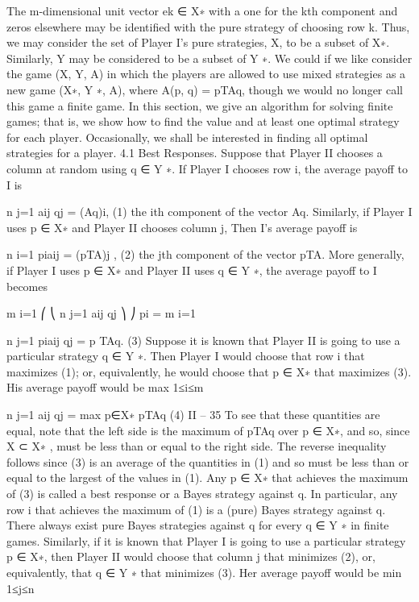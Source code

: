 The m-dimensional unit vector ek ∈ X∗ with a one for the kth component and zeros
elsewhere may be identified with the pure strategy of choosing row k. Thus, we may
consider the set of Player I’s pure strategies, X, to be a subset of X∗. Similarly, Y may
be considered to be a subset of Y ∗. We could if we like consider the game (X, Y, A) in
which the players are allowed to use mixed strategies as a new game (X∗, Y ∗, A), where
A(p, q) = pTAq, though we would no longer call this game a finite game.
In this section, we give an algorithm for solving finite games; that is, we show how to
find the value and at least one optimal strategy for each player. Occasionally, we shall be
interested in finding all optimal strategies for a player.
4.1 Best Responses. Suppose that Player II chooses a column at random using
q ∈ Y ∗. If Player I chooses row i, the average payoff to I is

n
j=1
aij qj = (Aq)i, (1)
the ith component of the vector Aq. Similarly, if Player I uses p ∈ X∗ and Player II
chooses column j, Then I’s average payoff is

n
i=1
piaij = (pTA)j , (2)
the jth component of the vector pTA. More generally, if Player I uses p ∈ X∗ and Player
II uses q ∈ Y ∗, the average payoff to I becomes

m
i=1
⎛
⎝
n
j=1
aij qj
⎞
⎠ pi = 
m
i=1

n
j=1
piaij qj = p
TAq. (3)
Suppose it is known that Player II is going to use a particular strategy q ∈ Y ∗. Then
Player I would choose that row i that maximizes (1); or, equivalently, he would choose
that p ∈ X∗ that maximizes (3). His average payoff would be
max
1≤i≤m

n
j=1
aij qj = max
p∈X∗ pTAq (4)
II – 35
To see that these quantities are equal, note that the left side is the maximum of pTAq over
p ∈ X∗, and so, since X ⊂ X∗ , must be less than or equal to the right side. The reverse
inequality follows since (3) is an average of the quantities in (1) and so must be less than
or equal to the largest of the values in (1).
Any p ∈ X∗ that achieves the maximum of (3) is called a best response or a Bayes
strategy against q. In particular, any row i that achieves the maximum of (1) is a (pure)
Bayes strategy against q. There always exist pure Bayes strategies against q for every
q ∈ Y ∗ in finite games.
Similarly, if it is known that Player I is going to use a particular strategy p ∈ X∗, then
Player II would choose that column j that minimizes (2), or, equivalently, that q ∈ Y ∗
that minimizes (3). Her average payoff would be
min
1≤j≤n


